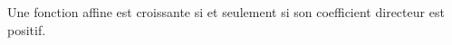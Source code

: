 Une fonction affine est croissante si et seulement si son coefficient directeur est positif.

\begin{reponses}
\end{reponses}

\begin{comment}

\end{comment}

